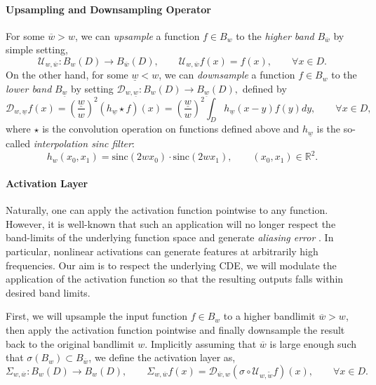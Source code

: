 \documentclass[reqno,10pt]{amsart}
\theoremstyle{plain}
\newcommand{\sinc}{\text{sinc}}
\theoremstyle{definition}
\newcommand{\bb}[1]{\mathbb{#1}}
\newcommand{\cal}[1]{\mathcal{#1}}
\begin{document}
    \paragraph{\bf Upsampling and Downsampling Operator} For some $\overline{w} > w$, we can {\it upsample} a function $f \in B_w$ to the {\it higher band} $B_{\overline{w}}$ by simple setting,
    \begin{equation}\label{equp}
    \cal U_{w,\overline{w}}: B_w(D) \to B_{\overline{w}}(D), \qquad \cal U_{w,\overline{w}} f(x) = f(x), \qquad \forall x\in D.
    \end{equation}
    On the other hand, for some $\underline{w} < w$, we can {\it downsample} a function $ f\in B_w$ to the {\it lower band} $B_{\underline{w}}$ by setting $\cal D_{w,\underline{w}} : B_w(D) \to B_{\underline{w}}(D),$ defined by 
    \begin{equation}\label{eqdown}
        \cal D_{w,\underline{w}}f(x) = \left(\frac{\underline{w}}{w}\right)^2 (h_{\underline{w}} \star f)(x) = \left(\frac{\underline{w}}{w}\right)^2 \int_D h_{\underline{w}}(x-y) f(y) dy, \qquad \forall x\in D,
    \end{equation}
    where $\star$ is the convolution operation on functions defined above and $h_{\underline{w}}$ is the so-called {\it interpolation sinc filter}:
    \begin{equation}\label{eq2.5}
        h_w(x_0,x_1) = \sinc(2wx_0) \cdot \sinc(2wx_1), \qquad (x_0,x_1) \in \bb R^2.
    \end{equation}

    \paragraph{\bf Activation Layer} Naturally, one can apply the activation function pointwise to any function. However, it is well-known that such an application will no longer respect the band-limits of the underlying function space and generate {\it aliasing error} \cite{FB2023}. In particular, nonlinear activations can generate features at arbitrarily high frequencies. Our aim is to respect the underlying CDE, we will modulate the application of the activation function so that the resulting outputs falls within desired band limits.

    \noindent First, we will upsample the input function $f \in B_w$ to a higher bandlimit $\overline{w} > w$, then apply the activation function pointwise and finally downsample the result back to the original bandlimit $w$. Implicitly assuming that $\overline{w}$ is large enough such that $\sigma(B_w) \subset B_{\overline{w}}$, we define the activation layer as,
    \begin{equation}\label{eqactivation}
        \Sigma_{w,\overline{w}} : B_w(D) \to B_w(D), \qquad \Sigma_{w,\overline{w}} f(x) = \cal D_{\overline{w},w}(\sigma \circ \cal U_{w,\tilde{w}} f)(x), \qquad \forall x\in D.
    \end{equation}
\end{document}
